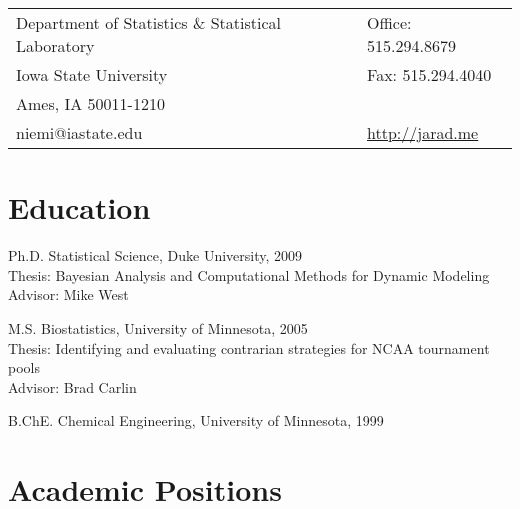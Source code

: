\documentclass[overlapped,line,letterpaper]{res}
\begin{document}

\setlength{\leftmargini}{0em}
\renewcommand{\labelitemi}{}

\renewcommand{\namefont}{\large\textbf}



\begin{resume}

\begin{tabular}{ll}
  Department of Statistics \& Statistical Laboratory    & Office: 515.294.8679 \\
  Iowa State University                   &  Fax: \hspace{.07in} 515.294.4040 \\
  Ames, IA 50011-1210        & \\
  niemi@iastate.edu  & \url{http://jarad.me}
\end{tabular}




\section{\bf Education}
Ph.D. Statistical Science, Duke University, 2009 \\%
Thesis: Bayesian Analysis and Computational Methods for Dynamic Modeling\\
Advisor: Mike West

M.S. Biostatistics, University of Minnesota, 2005\\%
Thesis: Identifying and evaluating contrarian strategies for NCAA tournament pools \\
Advisor: Brad Carlin

B.ChE. Chemical Engineering, University of Minnesota, 1999%



\section{\bf Academic Positions}


\end{resume}
\end{document}
